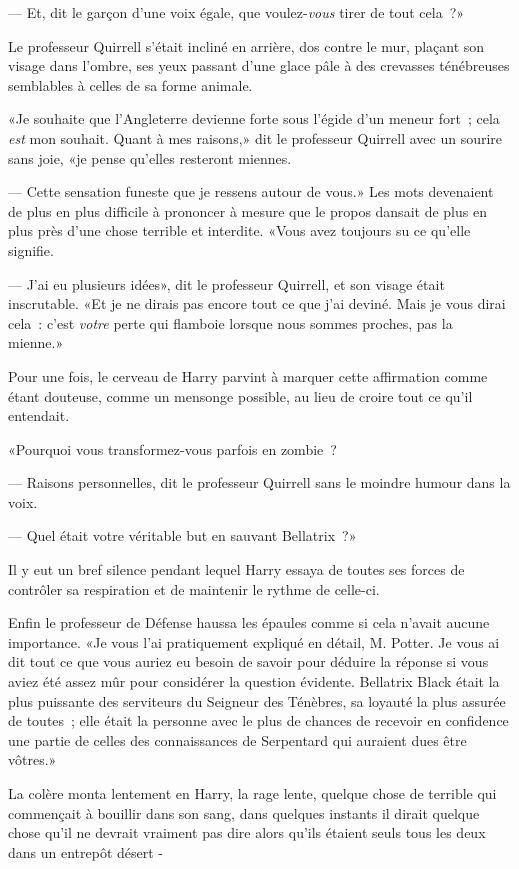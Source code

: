 --- Et, dit le garçon d'une voix égale, que voulez-\emph{vous} tirer de tout cela~?»

Le professeur Quirrell s'était incliné en arrière, dos contre le mur, plaçant son visage dans l'ombre, ses yeux passant d'une glace pâle à des crevasses ténébreuses semblables à celles de sa forme animale.

«Je souhaite que l'Angleterre devienne forte sous l'égide d'un meneur fort~; cela \emph{est} mon souhait. Quant à mes raisons,» dit le professeur Quirrell avec un sourire sans joie, «je pense qu'elles resteront miennes.

--- Cette sensation funeste que je ressens autour de vous.» Les mots devenaient de plus en plus difficile à prononcer à mesure que le propos dansait de plus en plus près d'une chose terrible et interdite. «Vous avez toujours su ce qu'elle signifie.

--- J'ai eu plusieurs idées», dit le professeur Quirrell, et son visage était inscrutable. «Et je ne dirais pas encore tout ce que j'ai deviné. Mais je vous dirai cela~: c'est \emph{votre} perte qui flamboie lorsque nous sommes proches, pas la mienne.»

Pour une fois, le cerveau de Harry parvint à marquer cette affirmation comme étant douteuse, comme un mensonge possible, au lieu de croire tout ce qu'il entendait.

«Pourquoi vous transformez-vous parfois en zombie~?

--- Raisons personnelles, dit le professeur Quirrell sans le moindre humour dans la voix.

--- Quel était votre véritable but en sauvant Bellatrix~?»

Il y eut un bref silence pendant lequel Harry essaya de toutes ses forces de contrôler sa respiration et de maintenir le rythme de celle-ci.

Enfin le professeur de Défense haussa les épaules comme si cela n'avait aucune importance. «Je vous l'ai pratiquement expliqué en détail, M. Potter. Je vous ai dit tout ce que vous auriez eu besoin de savoir pour déduire la réponse si vous aviez été assez mûr pour considérer la question évidente. Bellatrix Black était la plus puissante des serviteurs du Seigneur des Ténèbres, sa loyauté la plus assurée de toutes~; elle était la personne avec le plus de chances de recevoir en confidence une partie de celles des connaissances de Serpentard qui auraient dues être vôtres.»

La colère monta lentement en Harry, la rage lente, quelque chose de terrible qui commençait à bouillir dans son sang, dans quelques instants il dirait quelque chose qu'il ne devrait vraiment pas dire alors qu'ils étaient seuls tous les deux dans un entrepôt désert -

